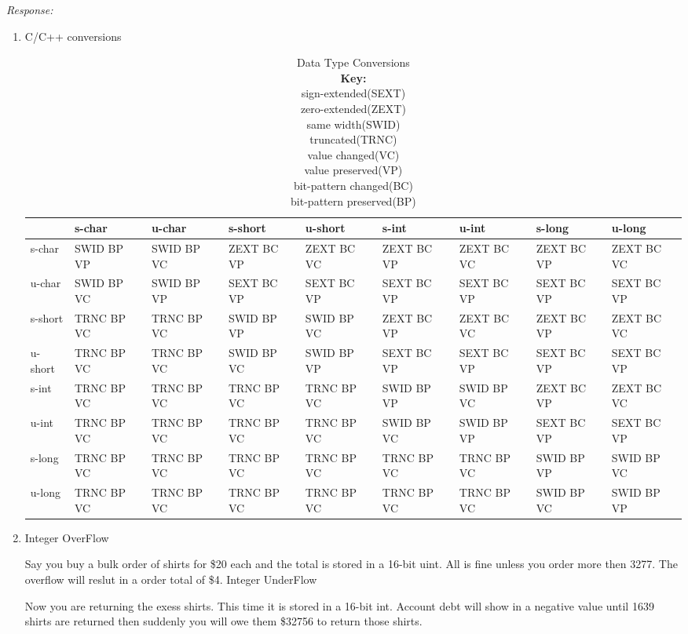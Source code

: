 \documentclass[a4paper, 11pt]{article}
\newenvironment{response}
                {\textit{Response:}}
                {}
\begin{document}
\begin{response}
  \begin{enumerate}[label=\arabic*.]
  \item
    C/C++ conversions
    \begin{table}[h!]
      \label{tab:Conversions} {\tiny
      \begin{tabular}{|l|l|l|l|l|l|l|l|l|}
        \hline 
                 & s-char     & u-char     & s-short    & u-short    & s-int      & u-int      & s-long     & u-long    \\ \hline
        s-char   & SWID BP VP & SWID BP VC & ZEXT BC VP & ZEXT BC VC & ZEXT BC VP & ZEXT BC VC & ZEXT BC VP & ZEXT BC VC\\ \hline
        u-char   & SWID BP VC & SWID BP VP & SEXT BC VP & SEXT BC VP & SEXT BC VP & SEXT BC VP & SEXT BC VP & SEXT BC VP\\ \hline
        s-short  & TRNC BP VC & TRNC BP VC & SWID BP VP & SWID BP VC & ZEXT BC VP & ZEXT BC VC & ZEXT BC VP & ZEXT BC VC\\ \hline
        u-short  & TRNC BP VC & TRNC BP VC & SWID BP VC & SWID BP VP & SEXT BC VP & SEXT BC VP & SEXT BC VP & SEXT BC VP\\ \hline
        s-int    & TRNC BP VC & TRNC BP VC & TRNC BP VC & TRNC BP VC & SWID BP VP & SWID BP VC & ZEXT BC VP & ZEXT BC VC\\ \hline
        u-int    & TRNC BP VC & TRNC BP VC & TRNC BP VC & TRNC BP VC & SWID BP VC & SWID BP VP & SEXT BC VP & SEXT BC VP\\ \hline
        s-long   & TRNC BP VC & TRNC BP VC & TRNC BP VC & TRNC BP VC & TRNC BP VC & TRNC BP VC & SWID BP VP & SWID BP VC\\ \hline
        u-long   & TRNC BP VC & TRNC BP VC & TRNC BP VC & TRNC BP VC & TRNC BP VC & TRNC BP VC & SWID BP VC & SWID BP VP\\ \hline
      \end{tabular}}
      \caption{Data Type Conversions
          \\{\bf Key:}
          \\sign-extended(SEXT) \\zero-extended(ZEXT) \\same width(SWID)
          \\truncated(TRNC) \\value changed(VC) \\value preserved(VP)
          \\bit-pattern changed(BC) \\bit-pattern preserved(BP)}
    \end{table}
  \item
    Integer OverFlow
    
    Say you buy a bulk order of shirts for \$20 each and the total is stored in a 16-bit uint. All is fine unless you order more then 3277. The overflow will reslut in a order total of \$4.
    \newpage
    Integer UnderFlow
    
    Now you are returning the exess shirts. This time it is stored in a 16-bit int. Account debt will show in a negative value until 1639 shirts are returned then suddenly you will owe them \$32756 to return those shirts.
    

\end{enumerate}
\end{response}
\end{document}
